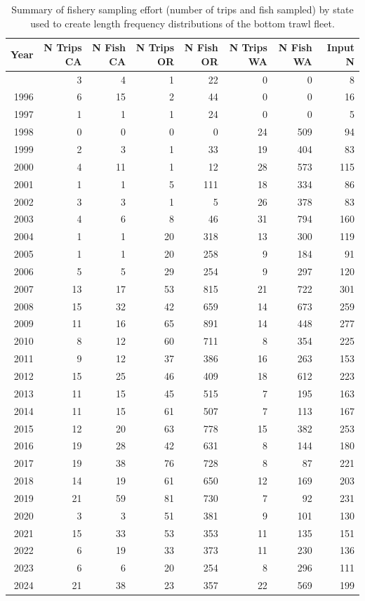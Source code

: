 \documentclass[
]{scrartcl}
\begin{document}
\endgroup

\newpage{}

\begingroup
\fontsize{9.0pt}{10.8pt}\selectfont

\begin{longtable}{rrrrrrrr}

\caption{\label{tbl-BT_lengths_sample_sizes}Summary of fishery sampling
effort (number of trips and fish sampled) by state used to create length
frequency distributions of the bottom trawl fleet.}

\tabularnewline

\toprule
Year & N Trips CA & N Fish CA & N Trips OR & N Fish OR & N Trips WA & N Fish WA & Input N \\ 
\midrule\addlinespace[2.5pt]
1995 & 3 & 4 & 1 & 22 & 0 & 0 & 8 \\ 
1996 & 6 & 15 & 2 & 44 & 0 & 0 & 16 \\ 
1997 & 1 & 1 & 1 & 24 & 0 & 0 & 5 \\ 
1998 & 0 & 0 & 0 & 0 & 24 & 509 & 94 \\ 
1999 & 2 & 3 & 1 & 33 & 19 & 404 & 83 \\ 
2000 & 4 & 11 & 1 & 12 & 28 & 573 & 115 \\ 
2001 & 1 & 1 & 5 & 111 & 18 & 334 & 86 \\ 
2002 & 3 & 3 & 1 & 5 & 26 & 378 & 83 \\ 
2003 & 4 & 6 & 8 & 46 & 31 & 794 & 160 \\ 
2004 & 1 & 1 & 20 & 318 & 13 & 300 & 119 \\ 
2005 & 1 & 1 & 20 & 258 & 9 & 184 & 91 \\ 
2006 & 5 & 5 & 29 & 254 & 9 & 297 & 120 \\ 
2007 & 13 & 17 & 53 & 815 & 21 & 722 & 301 \\ 
2008 & 15 & 32 & 42 & 659 & 14 & 673 & 259 \\ 
2009 & 11 & 16 & 65 & 891 & 14 & 448 & 277 \\ 
2010 & 8 & 12 & 60 & 711 & 8 & 354 & 225 \\ 
2011 & 9 & 12 & 37 & 386 & 16 & 263 & 153 \\ 
2012 & 15 & 25 & 46 & 409 & 18 & 612 & 223 \\ 
2013 & 11 & 15 & 45 & 515 & 7 & 195 & 163 \\ 
2014 & 11 & 15 & 61 & 507 & 7 & 113 & 167 \\ 
2015 & 12 & 20 & 63 & 778 & 15 & 382 & 253 \\ 
2016 & 19 & 28 & 42 & 631 & 8 & 144 & 180 \\ 
2017 & 19 & 38 & 76 & 728 & 8 & 87 & 221 \\ 
2018 & 14 & 19 & 61 & 650 & 12 & 169 & 203 \\ 
2019 & 21 & 59 & 81 & 730 & 7 & 92 & 231 \\ 
2020 & 3 & 3 & 51 & 381 & 9 & 101 & 130 \\ 
2021 & 15 & 33 & 53 & 353 & 11 & 135 & 151 \\ 
2022 & 6 & 19 & 33 & 373 & 11 & 230 & 136 \\ 
2023 & 6 & 6 & 20 & 254 & 8 & 296 & 111 \\ 
2024 & 21 & 38 & 23 & 357 & 22 & 569 & 199 \\ 
\bottomrule


\end{longtable}
\end{document}
